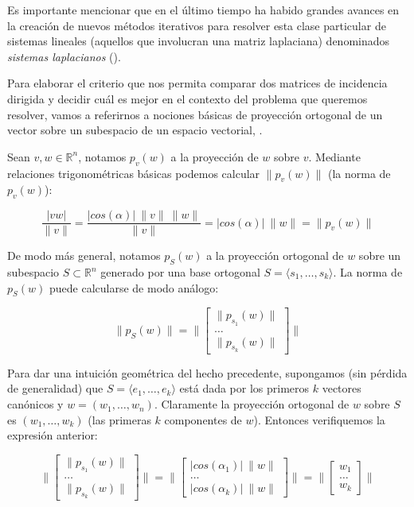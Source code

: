 \documentclass[conference,compsoc,a4paper]{IEEEtran}
\begin{document}
\smallskip

Es importante mencionar que en el último 
tiempo ha habido grandes avances en la creación de nuevos métodos 
iterativos para resolver esta clase particular de sistemas lineales 
(aquellos que involucran una matriz laplaciana) denominados 
\textit{sistemas laplacianos} (\cite{KMP:2010,Spielman:2010,ST:2004,
Teng:2010}).

\bigskip


Para elaborar el criterio que nos permita comparar dos matrices de 
incidencia dirigida y decidir cuál es mejor en el contexto del problema 
que queremos resolver, vamos a referirnos a nociones básicas de 
proyección ortogonal de un vector sobre un subespacio de un espacio 
vectorial, \cite{WK:2009}.

\smallskip

Sean $v,w \in \mathbb{R}^n$, notamos $p_v(w)$ a la proyección de $w$ 
sobre $v$. Mediante relaciones trigonométricas básicas podemos 
calcular $\|p_v(w)\|$ (la norma de $p_v(w)$):

$$\frac{|v w|}{\|v\|} = \frac{|cos(\alpha)| \ \|v\| \ \|w\|}{\|v\|} = 
|cos(\alpha)| \ \|w\| = \|p_v(w)\|$$

De modo más general, notamos $p_S(w)$ a la proyección ortogonal de $w$
sobre un subespacio $S \subset \mathbb{R}^n$ generado por una base 
ortogonal $S = \langle s_1, \dots, s_k\rangle $. La norma de $p_S(w)$ puede calcularse
de modo análogo:

$$
\|p_S(w)\| = \|\begin{bmatrix}
	\|p_{s_1}(w)\| \\
	\dots \\
	\|p_{s_k}(w)\|
\end{bmatrix}\|
$$

\smallskip

Para dar una intuición geométrica del hecho precedente, supongamos (sin 
pérdida de generalidad) que $S = \langle e_1, \dots, e_k\rangle $ está dada por los 
primeros $k$ vectores canónicos y $w = (w_1, \dots, w_n)$. 
Claramente la proyección ortogonal de $w$ sobre $S$ es 
$(w_1, \dots, w_k)$ (las primeras $k$ componentes de $w$). Entonces 
verifiquemos la expresión anterior:

$$
\|\begin{bmatrix}
	\|p_{s_1}(w)\| \\	
	\dots \\
	\|p_{s_k}(w)\|
\end{bmatrix}\| = 
\|\begin{bmatrix}
	|cos(\alpha_1)| \ \|w\| \\
	\dots \\
	|cos(\alpha_k)| \ \|w\|
\end{bmatrix}\| = 
\|\begin{bmatrix}
	w_1 \\
	\dots \\
	w_k
\end{bmatrix}\|
$$
\end{document}
